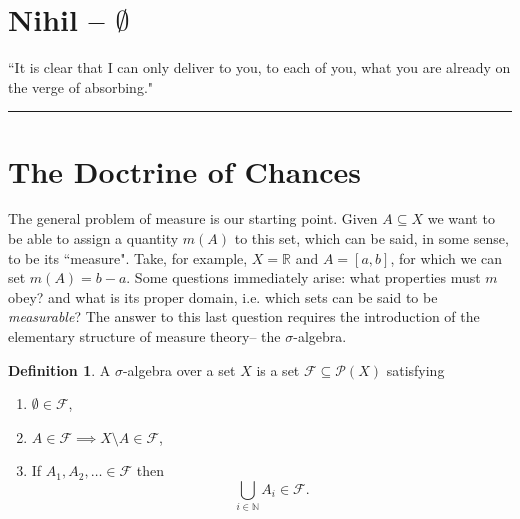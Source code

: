 \documentclass[reqno,a4paper,12pt]{amsart}%
\numberwithin{equation}{section}
\theoremstyle{definition}
\newtheorem{definition}[theorem]{Definition}
\newcommand {\RR}{\mathbb{R}}
\newcommand {\NN}{\mathbb{N}}
\begin{document}
\vfil
\pagebreak	

\tableofcontents
	
\section*{Nihil -- $\emptyset$}
	
\begin{quoting}
``It is clear that I can only deliver to you, to each of you, what you are already on the verge of absorbing."  
\end{quoting}


\par\noindent\rule{\textwidth}{0.1pt}
		
\section{The Doctrine of Chances}

The general problem of measure is our starting point. Given $A \subseteq X$ we want to be able to assign a quantity $m(A)$ to this set, which can be said, in some sense, to be its ``measure". Take, for example, $X=\RR$  and $A = [a,b]$, for which we can set $m (A)  = b-a$. Some questions immediately arise: what properties must $m$ obey? and what is its proper domain, i.e. which sets can be said to be \textit{measurable}? The answer to this last question requires the introduction of the elementary structure of measure theory-- the $\sigma$-algebra.
\begin{definition}
	A $\sigma$-algebra over a set $X$ is a set $\mathcal{F} \subseteq \mathcal{P}(X)$ satisfying
	\begin{enumerate}
		\item $\emptyset \in \mathcal{F}$,
		\item $A \in \mathcal{F} \implies X \setminus A \in \mathcal{F}$,
		\item If $A_1, A_2, \ldots \in \mathcal{F}$ then
		\[
		\bigcup_{i \in \NN} A_i \in \mathcal{F}.
		\]
	\end{enumerate}
\end{definition}
	
 
\end{document}
